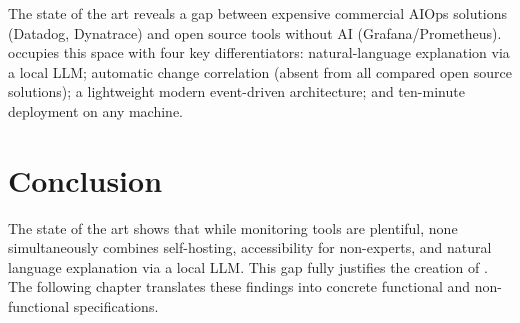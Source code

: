 The state of the art reveals a gap between expensive commercial AIOps solutions
(Datadog, Dynatrace) and open source tools without AI (Grafana/Prometheus).
\caimp{} occupies this space with four key differentiators: natural-language
explanation via a local LLM; automatic change correlation (absent from all
compared open source solutions); a lightweight modern event-driven architecture;
and ten-minute deployment on any machine.

\section*{Conclusion}

The state of the art shows that while monitoring tools are plentiful, none
simultaneously combines self-hosting, accessibility for non-experts, and natural
language explanation via a local LLM. This gap fully justifies the creation of
\caimp{}. The following chapter translates these findings into concrete functional
and non-functional specifications.
